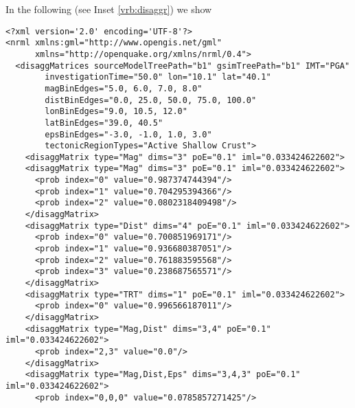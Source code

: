 In the following (see Inset \ref{vrb:disaggr}) we show 
\begin{Verbatim}[frame=single, commandchars=\\\{\}, fontsize=\small]
<?xml version='2.0' encoding='UTF-8'?>
<nrml xmlns:gml="http://www.opengis.net/gml" 
      xmlns="http://openquake.org/xmlns/nrml/0.4">
  <disaggMatrices sourceModelTreePath="b1" gsimTreePath="b1" IMT="PGA" 
        investigationTime="50.0" lon="10.1" lat="40.1" 
        magBinEdges="5.0, 6.0, 7.0, 8.0" 
        distBinEdges="0.0, 25.0, 50.0, 75.0, 100.0" 
        lonBinEdges="9.0, 10.5, 12.0" 
        latBinEdges="39.0, 40.5" 
        epsBinEdges="-3.0, -1.0, 1.0, 3.0" 
        tectonicRegionTypes="Active Shallow Crust">
    <disaggMatrix type="Mag" dims="3" poE="0.1" iml="0.033424622602">
    <disaggMatrix type="Mag" dims="3" poE="0.1" iml="0.033424622602">
      <prob index="0" value="0.987374744394"/>
      <prob index="1" value="0.704295394366"/>
      <prob index="2" value="0.0802318409498"/>
    </disaggMatrix>
    <disaggMatrix type="Dist" dims="4" poE="0.1" iml="0.033424622602">
      <prob index="0" value="0.700851969171"/>
      <prob index="1" value="0.936680387051"/>
      <prob index="2" value="0.761883595568"/>
      <prob index="3" value="0.238687565571"/>
    </disaggMatrix>
    <disaggMatrix type="TRT" dims="1" poE="0.1" iml="0.033424622602">
      <prob index="0" value="0.996566187011"/>
    </disaggMatrix>
    <disaggMatrix type="Mag,Dist" dims="3,4" poE="0.1" iml="0.033424622602">
      <prob index="2,3" value="0.0"/>
    </disaggMatrix>
    <disaggMatrix type="Mag,Dist,Eps" dims="3,4,3" poE="0.1" iml="0.033424622602">
      <prob index="0,0,0" value="0.0785857271425"/>
\end{Verbatim}

